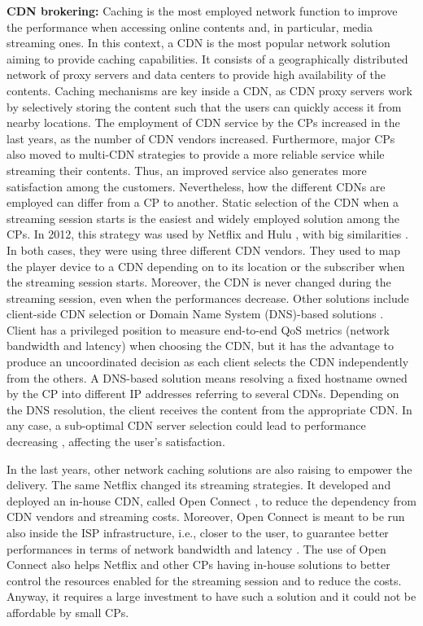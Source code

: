 \textbf{CDN brokering:}
Caching is the most employed network function to improve the performance when accessing online contents and, in particular, media streaming ones. In this context, a CDN is the most popular network solution aiming to provide caching capabilities. It consists of a geographically distributed network of proxy servers and data centers to provide high availability of the contents. Caching mechanisms are key inside a CDN, as CDN proxy servers work by selectively storing the content such that the users can quickly access it from nearby locations. The employment of CDN service by the CPs increased in the last years, as the number of CDN vendors increased. Furthermore, major CPs also moved to multi-CDN strategies to provide a more reliable service while streaming their contents. Thus, an improved service also generates more satisfaction among the customers. Nevertheless, how the different CDNs are employed can differ from a CP to another. Static selection of the CDN when a streaming session starts is the easiest and widely employed solution among the CPs. In 2012, this strategy was used by Netflix \cite{adhikari2012} and Hulu \cite{adhikari2012-2}, with big similarities \cite{adhikari2015}. In both cases, they were using three different CDN vendors. They used to map the player device to a CDN depending on to its location or the subscriber when the streaming session starts. Moreover, the CDN is never changed during the streaming session, even when the performances decrease.
Other solutions include client-side CDN selection \cite{otto2012} or Domain Name System (DNS)-based solutions \cite{torres2011}. Client has a privileged position to measure end-to-end QoS metrics (network bandwidth and latency) when choosing the CDN, but it has the advantage to produce an uncoordinated decision as each client selects the CDN independently from the others.
A DNS-based solution means resolving a fixed hostname owned by the CP into different IP addresses referring to several CDNs. Depending on the DNS resolution, the client receives the content from the appropriate CDN. In any case, a sub-optimal CDN server selection could lead to performance decreasing \cite{goel2015}, affecting the user's satisfaction.

In the last years, other network caching solutions are also raising to empower the delivery. The same Netflix changed its streaming strategies. It developed and deployed an in-house CDN, called Open Connect \cite{botteger2018}, to reduce the dependency from CDN vendors and streaming costs. Moreover, Open Connect is meant to be run also inside the ISP infrastructure, i.e., closer to the user, to guarantee better performances in terms of network bandwidth and latency \cite{Doan2020}. The use of Open Connect also helps Netflix and other CPs having in-house solutions to better control the resources enabled for the streaming session and to reduce the costs. Anyway, it requires a large investment to have such a solution and it could not be affordable by small CPs.

